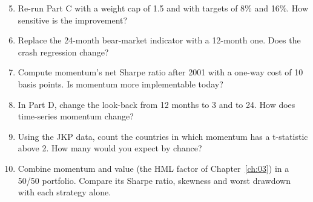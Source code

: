 \begin{enumerate}
  \setcounter{enumi}{4}
  \item Re-run Part C with a weight cap of 1.5 and with targets of 8\% and 16\%. How sensitive is the improvement?
  \item Replace the 24-month bear-market indicator with a 12-month one. Does the crash regression change?
  \item Compute momentum's net Sharpe ratio after 2001 with a one-way cost of 10 basis points. Is momentum more implementable today?
  \item In Part D, change the look-back from 12 months to 3 and to 24. How does time-series momentum change?
  \item Using the JKP data, count the countries in which momentum has a t-statistic above 2. How many would you expect by chance?
  \item Combine momentum and value (the HML factor of Chapter~\ref{ch:03}) in a 50/50 portfolio. Compare its Sharpe ratio, skewness and worst drawdown with each strategy alone.
\end{enumerate}
